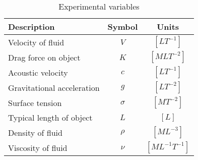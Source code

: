 \documentclass{article}%
\begin{document}
%
\normalsize%


\begin{table}[!htb]%
\centering%
\caption{Experimental variables}%
\label{tab:experimental-variables}%
\begin{tabular}{p{7cm} c c}%
\hline%
Description&Symbol&Units\\%
\hline%
\hline%
Velocity of fluid&$V$&$[LT^{-1}]$\\%
Drag force on object&$K$&$[MLT^{-2}]$\\%
Acoustic velocity&$c$&$[LT^{-1}]$\\%
Gravitational acceleration&$g$&$[LT^{-2}]$\\%
Surface tension&$\sigma$&$[MT^{-2}]$\\%
Typical length of object&$L$&$[L]$\\%
Density of fluid&$\rho$&$[ML^{-3}]$\\%
Viscosity of fluid&$\nu$&$[ML^{-1}T^{-1}]$\\%
\end{tabular}%
\end{table}

%
\end{document}
